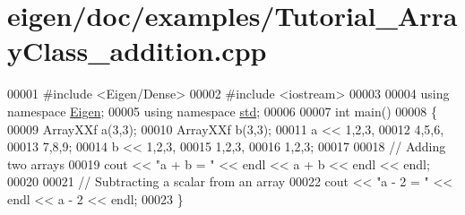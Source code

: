 \hypertarget{eigen_2doc_2examples_2_tutorial___array_class__addition_8cpp_source}{}\section{eigen/doc/examples/\+Tutorial\+\_\+\+Array\+Class\+\_\+addition.cpp}
\label{eigen_2doc_2examples_2_tutorial___array_class__addition_8cpp_source}

\begin{DoxyCode}
00001 \textcolor{preprocessor}{#include <Eigen/Dense>}
00002 \textcolor{preprocessor}{#include <iostream>}
00003 
00004 \textcolor{keyword}{using namespace }\hyperlink{namespace_eigen}{Eigen};
00005 \textcolor{keyword}{using namespace }\hyperlink{namespacestd}{std};
00006 
00007 \textcolor{keywordtype}{int} main()
00008 \{
00009   ArrayXXf a(3,3);
00010   ArrayXXf b(3,3);
00011   a << 1,2,3,
00012        4,5,6,
00013        7,8,9;
00014   b << 1,2,3,
00015        1,2,3,
00016        1,2,3;
00017        
00018   \textcolor{comment}{// Adding two arrays}
00019   cout << \textcolor{stringliteral}{"a + b = "} << endl << a + b << endl << endl;
00020 
00021   \textcolor{comment}{// Subtracting a scalar from an array}
00022   cout << \textcolor{stringliteral}{"a - 2 = "} << endl << a - 2 << endl;
00023 \}
\end{DoxyCode}
